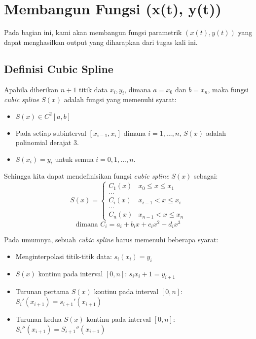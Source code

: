 \documentclass[journal,12pt,onecolumn,a4paper]{IEEEtran}
\begin{document}
\pagebreak

\section{Membangun Fungsi (x(t), y(t))}
Pada bagian ini, kami akan membangun fungsi parametrik \((x(t), y(t))\) yang dapat menghasilkan output yang diharapkan dari tugas kali ini.

\subsection{Definisi Cubic Spline}
Apabila diberikan \(n + 1\) titik data \(x_i, y_i\), dimana \(a = x_0\) dan \(b = x_n\), maka fungsi \emph{cubic spline} \(S(x)\) adalah fungsi yang memenuhi syarat:
\begin{itemize}
	\item \(S(x) \in C^2[a, b]\)
	\item Pada setiap subinterval \([x_{i - 1}, x_i]\) dimana \(i = 1, ..., n\), \(S(x)\) adalah polinomial derajat 3.
	\item \(S(x_i) = y_i\) untuk semua \(i = 0, 1, ..., n\).
\end{itemize}

Sehingga kita dapat mendefinisikan fungsi \emph{cubic spline} \(S(x)\) sebagai:
\begin{equation}
	S(x) = \begin{cases}
		C_1(x) & x_0 \leq x \leq x_1  \\
		\dots                         \\
		C_i(x) & x_{i-1} < x \leq x_i \\
		\dots                         \\
		C_n(x) & x_{n-1} < x \leq x_n
	\end{cases}
\end{equation}
\begin{equation}
	\text{dimana }C_i = a_i + b_ix + c_ix^2 + d_ix^3
\end{equation}

Pada umumnya, sebuah \emph{cubic spline} harus memenuhi beberapa syarat:
\begin{itemize}
	\item Menginterpolasi titik-titik data: \(s_i(x_i) = y_i\)
	\item \(S(x)\) kontinu pada interval \([0, n]\): \(s_i{x_i+1} = y_{i + 1}\)
	\item Turunan pertama \(S(x)\) kontinu pada interval \([0, n]\): \(S_i'(x_{i + 1}) = s_{i + 1}'(x_{i + 1})\)
	\item Turunan kedua \(S(x)\) kontinu pada interval \([0, n]\): \(S_i''(x_{i + 1}) = S_{i + 1}''(x_{i + 1})\)
\end{itemize}
\end{document}
